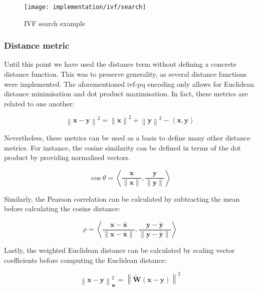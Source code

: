 \documentclass[../main.tex]{subfiles}
\begin{document}
\begin{figure}[htbp]
    \centering
    \texttt{[image: implementation/ivf/search]}
    \caption{IVF search example}
    \label{fig:4:ivf_search}
\end{figure}

\subsubsection{Distance metric}
Until this point we have used the distance term without defining a concrete distance function. This was to preserve generality, as several distance functions were implemented. The aforementioned \gls{ivf}-\gls{pq} encoding only allows for Euclidean distance minimisation and dot product maximisation. In fact, these metrics are related to one another:

\begin{equation}\label{eq:4:dot_l2}
    \left\lVert \bm{x} - \bm{y} \right\rVert^2 =
    \left\lVert \bm{x} \right\rVert^2 + \left\lVert \bm{y} \right\rVert^2 - \left\langle \bm{x},\bm{y} \right\rangle
\end{equation}

Nevertheless, these metrics can be used as a basis to define many other distance metrics. For instance, the cosine similarity can be defined in terms of the dot product by providing normalised vectors.

\begin{equation}\label{eq:4:cos}
    \cos \theta = \left\langle \frac{\bm{x}}{\lVert \bm{x} \rVert} , \frac{\bm{y}}{\lVert \bm{y} \rVert} \right\rangle
\end{equation}

Similarly, the Pearson correlation can be calculated by subtracting the mean before calculating the cosine distance:

\begin{equation}\label{eq:4:pearson}
    \rho = \left\langle \frac{\bm{x} - \bm{\bar{x}}}{\lVert \bm{x} - \bm{\bar{x}} \rVert} , \frac{\bm{y - \bm{\bar{y}}}}{\lVert \bm{y} - \bm{\bar{y}} \rVert} \right\rangle
\end{equation}

Lastly, the weighted Euclidean distance can be calculated by scaling vector coefficients before computing the Euclidean distance:

\begin{equation}\label{eq:4:l2_w}
    \left\lVert \bm{x} - \bm{y} \right\rVert^2_{\bm{w}} = \left\lVert \bm{\tilde{W}}(\bm{x} - \bm{y}) \right\rVert^2
\end{equation}
\end{document}

